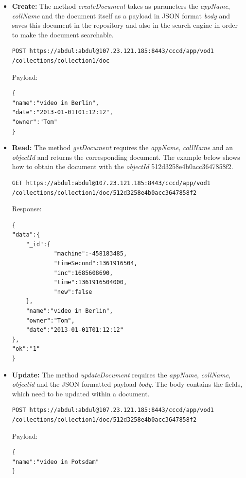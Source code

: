 \begin{itemize}
\item \textbf{Create:} The method \textit{createDocument} takes as parameters  the \textit{appName}, \textit{collName} and  the document itself as a payload in \ac{JSON} format \textit{body} and saves this document in the repository and also in the search engine in order to make the document searchable.  

\begin{code}
\begin{verbatim}
POST https://abdul:abdul@107.23.121.185:8443/cccd/app/vod1
/collections/collection1/doc
\end{verbatim}
Payload:
\begin{verbatim}
{
"name":"video in Berlin",
"date":"2013-01-01T01:12:12",
"owner":"Tom"
}
\end{verbatim}
\end{code}


\item \textbf{Read:} The method \textit{getDocument} requires the \textit{appName}, \textit{collName} and an \textit{objectId} and returns the corresponding document. The example below shows how to obtain the document with the \textit{objectId} 512d3258e4b0acc3647858f2.

\begin{code}
\begin{verbatim}
GET https://abdul:abdul@107.23.121.185:8443/cccd/app/vod1
/collections/collection1/doc/512d3258e4b0acc3647858f2
\end{verbatim}
Response:
\begin{verbatim}
{
"data":{
	"_id":{
			"machine":-458183485,
			"timeSecond":1361916504,
			"inc":1685608690,
			"time":1361916504000,
			"new":false
	},
	"name":"video in Berlin",
	"owner":"Tom",
	"date":"2013-01-01T01:12:12"
},
"ok":"1"
}
\end{verbatim}
\end{code}

\item \textbf{Update:} The method \textit{updateDocument} requires the \textit{appName}, \textit{collName}, \textit{objectid} and the \ac{JSON} formatted payload \textit{body}. The body contains  the fields, which need to be updated within a document.

\begin{code}
\begin{verbatim}
POST https://abdul:abdul@107.23.121.185:8443/cccd/app/vod1
/collections/collection1/doc/512d3258e4b0acc3647858f2
\end{verbatim}
Payload:
\begin{verbatim}
{
"name":"video in Potsdam"
}
\end{verbatim}
\end{code}


\end{itemize}
